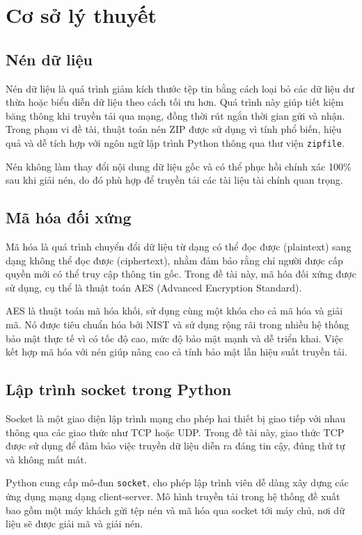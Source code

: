 \chapter{Cơ sở lý thuyết}

\section{Nén dữ liệu}

Nén dữ liệu là quá trình giảm kích thước tệp tin bằng cách loại bỏ các dữ liệu dư thừa hoặc biểu diễn dữ liệu theo cách tối ưu hơn. Quá trình này giúp tiết kiệm băng thông khi truyền tải qua mạng, đồng thời rút ngắn thời gian gửi và nhận. Trong phạm vi đề tài, thuật toán nén ZIP được sử dụng vì tính phổ biến, hiệu quả và dễ tích hợp với ngôn ngữ lập trình Python thông qua thư viện \texttt{zipfile}.

Nén không làm thay đổi nội dung dữ liệu gốc và có thể phục hồi chính xác 100\% sau khi giải nén, do đó phù hợp để truyền tải các tài liệu tài chính quan trọng.

\section{Mã hóa đối xứng}

Mã hóa là quá trình chuyển đổi dữ liệu từ dạng có thể đọc được (plaintext) sang dạng không thể đọc được (ciphertext), nhằm đảm bảo rằng chỉ người được cấp quyền mới có thể truy cập thông tin gốc. Trong đề tài này, mã hóa đối xứng được sử dụng, cụ thể là thuật toán AES (Advanced Encryption Standard).

AES là thuật toán mã hóa khối, sử dụng cùng một khóa cho cả mã hóa và giải mã. Nó được tiêu chuẩn hóa bởi NIST và sử dụng rộng rãi trong nhiều hệ thống bảo mật thực tế vì có tốc độ cao, mức độ bảo mật mạnh và dễ triển khai. Việc kết hợp mã hóa với nén giúp nâng cao cả tính bảo mật lẫn hiệu suất truyền tải.

\section{Lập trình socket trong Python}

Socket là một giao diện lập trình mạng cho phép hai thiết bị giao tiếp với nhau thông qua các giao thức như TCP hoặc UDP. Trong đề tài này, giao thức TCP được sử dụng để đảm bảo việc truyền dữ liệu diễn ra đáng tin cậy, đúng thứ tự và không mất mát.

Python cung cấp mô-đun \texttt{socket}, cho phép lập trình viên dễ dàng xây dựng các ứng dụng mạng dạng client-server. Mô hình truyền tải trong hệ thống đề xuất bao gồm một máy khách gửi tệp nén và mã hóa qua socket tới máy chủ, nơi dữ liệu sẽ được giải mã và giải nén.

